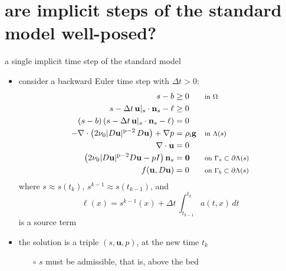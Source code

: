 \documentclass[10pt,svgnames]{beamer}
\newcommand{\bg}{\mathbf{g}}
\newcommand{\bn}{\mathbf{n}}
\newcommand{\bu}{\mathbf{u}}
\newcommand{\bzero}{\bm{0}}
\newcommand{\pp}{\mathrm{p}}
\newcommand{\rhoi}{\rho_{\text{i}}}
\newcommand{\where}[1]{\text{\footnotesize #1}}
\newcommand{\aler}[1]{{\color{FireBrick} #1}}
\begin{document}
\section{are implicit steps of the standard model well-posed?}

\begin{frame}{a single implicit time step of the standard model}

\begin{itemize}
\item consider a \aler{backward Euler time step} with $\Delta t>0$:
{\small
\begin{align*}
s - b &\ge 0 & &\where{in $\Omega$} \\
s - \Delta t\, \bu|_s \cdot \bn_s - \ell &\ge 0 \\
(s - b) \left(s - \Delta t\, \bu|_s \cdot \bn_s - \ell\right) &= 0 \\
- \nabla \cdot \left(2 \nu_0 |D\bu|^{\pp-2}\, D\bu\right) + \nabla p &= \rhoi \bg && \where{in $\Lambda(s)$} \\
\nabla \cdot \bu &= 0 \\
\left(2 \nu_0 |D\bu|^{\pp-2} D\bu - pI\right) \bn_s &= \bzero && \where{on $\Gamma_s \subset \partial\Lambda(s)$} \\
f(\bu,D\bu) &= 0 && \where{on $\Gamma_b \subset \partial\Lambda(s)$}
\end{align*}
}
where \aler{$s \approx s(t_k)$}, $s^{k-1}\approx s(t_{k-1})$, and
{\small
    $$\ell(x) = s^{k-1}(x) + \Delta t\,\int_{t_{k-1}}^{t_k} a(t,x)\,dt$$
}
is a source term
\item \aler{the solution is a triple $(s,\bu,p)$, at the new time $t_k$}
    \begin{itemize}
    \item[$\circ$] $s$ must be admissible, that is, above the bed
    \end{itemize}
\end{itemize}
\end{frame}
\end{document}
